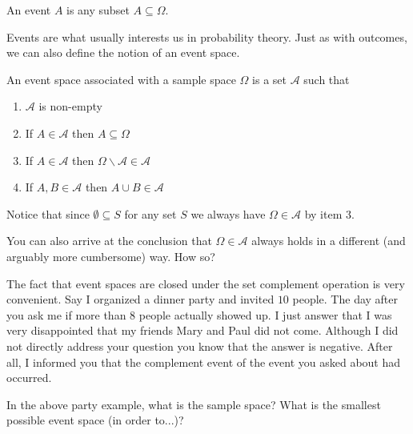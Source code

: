 \documentclass[a4paper,11pt,leqno]{report}
\begin{document}
\begin{Definition} 
An event $ A $ is any subset $ A \subseteq \Omega $.
\end{Definition}

Events are what usually interests us in probability theory. Just as with outcomes, we can 
also define the notion of an event space.

\begin{Definition} 
An event space associated with a sample space $ \Omega $ is a set $ \mathcal{A} $ such that
\begin{enumerate}
\item $ \mathcal{A} $ is non-empty
\item If $ A \in \mathcal{A} $ then $ A \subseteq \Omega $
\item If $ A \in \mathcal{A} $ then $ \Omega\backslash \mathcal{A} \in \mathcal{A} $
\item If $ A,B \in \mathcal{A} $ then $ A \cup B \in \mathcal{A} $
\end{enumerate}
\end{Definition}

Notice that since $ \emptyset \subseteq S $ for any set $ S $ we always have $ \Omega \in \mathcal{A} $
by item 3.

\begin{Exercise} 
You can also arrive at the conclusion that $ \Omega \in \mathcal{A} $ always holds in a 
different (and arguably more cumbersome) way. How so?
\end{Exercise}

The fact that event spaces are closed under the set complement operation is very convenient. Say I
organized a dinner party and invited $ 10 $ people. The day after you ask me if more than $ 8 $ people
actually showed up. I just answer that I was very disappointed that my friends Mary and Paul did 
not come. Although I did not directly address your question you know that the answer is negative. After
all, I informed you that the complement event of the event you asked about had occurred.

\begin{Exercise} 
In the above party example, what is the sample space? What is the smallest possible event space (in order to...)?
\end{Exercise}
\end{document}
